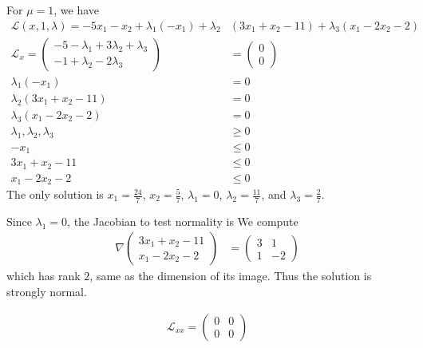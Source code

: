\documentclass[12pt]{article}
\begin{document}
\begin{problem}[4]
For $ \mu=1$, we have
\begin{align*}
	\mathscr{L}(x,1,\lambda) = -5x_1-x_2 +\lambda_1(-x_1) + \lambda_2 & (3x_1+x_2-11)+ \lambda_3(x_1-2x_2-2) \\
	\mathscr{L}_x = \begin{pmatrix}  -5-\lambda_1+3\lambda_2+\lambda_3\\ -1+\lambda_2-2\lambda_3 \end{pmatrix}  &= \begin{pmatrix} 0\\0 \end{pmatrix}  \\
	\lambda_1(-x_1) &= 0 \\
	\lambda_2(3x_1+x_2-11) &= 0 \\
	\lambda_3(x_1-2x_2-2) &= 0 \\
	\lambda_1,\lambda_2,\lambda_3 &\geq 0\\
	-x_1 &\leq 0\\
	3x_1+x_2-11 &\leq 0\\
	x_1-2x_2-2 & \leq 0
\end{align*}
The only solution is $ x_1= \frac{24}{7}$, $ x_2 = \frac{5}{7}$, $ \lambda_1 = 0$, $ \lambda_2=\frac{11}{7}$, and $ \lambda_3 = \frac{2}{7}$.

Since $ \lambda_1=0$, the Jacobian to test normality is
We compute
\begin{align*}
	\nabla \begin{pmatrix} 3x_1+x_2-11\\x_1-2x_2-2 \end{pmatrix}  &= \begin{pmatrix} 3&1\\1&-2 \end{pmatrix}  
\end{align*}
which has rank $ 2$, same as the dimension of its image. Thus the solution is strongly normal.

\begin{align*}
	\mathscr{L}_{x x} = \begin{pmatrix} 0&0\\0&0 \end{pmatrix} 
\end{align*}


\end{problem}
\end{document}
